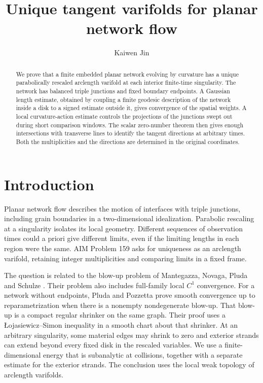 \documentclass[11pt,reqno]{amsart}
\title[Unique tangent varifolds for planar network flow]{Unique tangent varifolds for planar network flow}
\author{Kaiwen Jin}
\numberwithin{equation}{section}
\begin{document}
\begin{abstract}
We prove that a finite embedded planar network evolving by curvature has
a unique parabolically rescaled arclength varifold at each interior
finite-time singularity. The network has balanced triple junctions and
fixed boundary endpoints. A Gaussian length estimate, obtained by
coupling a finite geodesic description of the network inside a disk
to a signed estimate outside it, gives convergence of the spatial
weights. A local curvature-action estimate controls the projections of
the junctions swept out during short comparison windows. The scalar zero-number
theorem then gives enough intersections with transverse lines to
identify the tangent directions at arbitrary times. Both the
multiplicities and the directions are determined in the original
coordinates.
\end{abstract}
\maketitle

\section{Introduction}
\label{sec:introduction}

Planar network flow describes the motion of interfaces with triple
junctions, including grain boundaries in a two-dimensional idealization.
Parabolic rescaling at a singularity isolates its local geometry.
Different sequences of observation times could a priori give different
limits, even if the limiting lengths in each region were the same.
AIM Problem 159 \cite{AIM} asks for uniqueness as an arclength
varifold, retaining integer multiplicities and comparing limits in a
fixed frame.

The question is related to the blow-up problem of Mantegazza, Novaga,
Pluda and Schulze \cite[Open Problem~7.25 in the linked author version]{MNPS}.
Their problem also includes full-family local \(C^1\) convergence.
For a network without endpoints, Pluda and Pozzetta
\cite[Theorem~1.1]{PP} prove smooth convergence up to
reparametrization when there is a nonempty nondegenerate blow-up.
That blow-up is a compact regular shrinker on the same graph. Their proof uses a \L{}ojasiewicz--Simon inequality
in a smooth chart about that shrinker. At an arbitrary singularity,
some material edges may shrink to zero and exterior strands can
extend beyond every fixed disk in the rescaled variables. We use a
finite-dimensional energy that is subanalytic at collisions, together
with a separate estimate for the exterior strands. The conclusion
uses the local weak topology of arclength varifolds.
\end{document}
